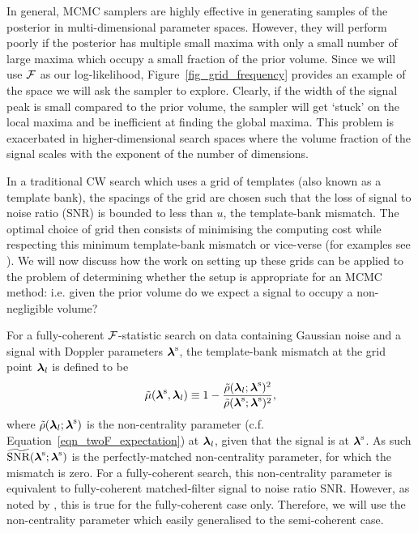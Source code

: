 \documentclass[aps, prd, twocolumn, superscriptaddress, floatfix, showpacs, nofootinbib, longbibliography]{revtex4-1}
\begin{document}
In general, MCMC samplers are highly effective in generating samples of the
posterior in multi-dimensional parameter spaces. However, they will perform
poorly if the posterior has multiple small maxima with only a small number of
large maxima which occupy a small fraction of the prior volume. Since we will
use ${\mathcal{F}}$ as our log-likelihood, Figure~\ref{fig_grid_frequency} provides an
example of the space we will ask the sampler to explore. Clearly, if the width
of the signal peak is small compared to the prior volume, the sampler will get
`stuck' on the local maxima and be inefficient at finding the global maxima.
This problem is exacerbated in higher-dimensional search spaces where the volume
fraction of the signal scales with the exponent of the number of dimensions.

In a traditional CW search which uses a grid of templates (also known as a
template bank), the spacings of the grid are chosen such that the loss of
signal to noise ratio (SNR) is bounded to less than $u$, the template-bank
mismatch. The optimal choice of grid then consists of minimising the computing
cost while respecting this minimum template-bank mismatch or vice-verse (for
examples see \citet{pletsch2010, prix2012, wette2013, wette2015}). We will now
discuss how the work on setting up these grids can be applied to the problem of
determining whether the setup is appropriate for an MCMC method: i.e. given the
prior volume do we expect a signal to occupy a non-negligible volume?

For a fully-coherent ${\mathcal{F}}$-statistic search on data containing Gaussian noise
and a signal with Doppler parameters $\boldsymbol{\mathbf{\lambda}}^{\rm s}$, the template-bank
mismatch at the grid point $\boldsymbol{\mathbf{\lambda}}_{l}$ is defined to be
\begin{align}
\tilde{\mu}(\boldsymbol{\mathbf{\lambda}}^{\rm s}, \boldsymbol{\mathbf{\lambda}}_{l}) \equiv 1 - 
\frac{\tilde{\rho}(\boldsymbol{\mathbf{\lambda}}_l;\boldsymbol{\mathbf{\lambda}}^{\rm s})^{2}}
{\tilde{\rho}(\boldsymbol{\mathbf{\lambda}}^{\rm s}; \boldsymbol{\mathbf{\lambda}}^{\rm s})^{2}},
\end{align}
where $\tilde{\rho}(\boldsymbol{\mathbf{\lambda}}_l; \boldsymbol{\mathbf{\lambda}}^{\rm s})$ is the non-centrality
parameter (c.f. Equation~\ref{eqn_twoF_expectation}) at $\boldsymbol{\mathbf{\lambda}}_l$, given
that the signal is at $\boldsymbol{\mathbf{\lambda}}^{\rm s}$. As such
$\widetilde{\textrm{SNR}}(\boldsymbol{\mathbf{\lambda}}^{\rm s}; \boldsymbol{\mathbf{\lambda}}^{\rm s})$ is the
perfectly-matched non-centrality parameter, for which the mismatch is zero.
For a fully-coherent search, this non-centrality parameter is equivalent to
fully-coherent matched-filter signal to noise ratio SNR. However,
as noted by \citet{leaci2015}, this is true for the fully-coherent case only.
Therefore, we will use the non-centrality parameter which easily generalised to
the semi-coherent case.
\end{document}
